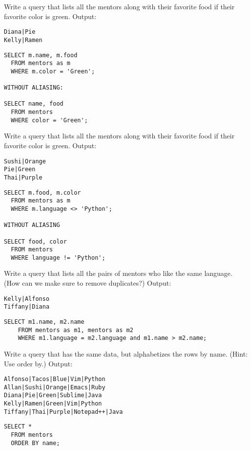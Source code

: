 \documentclass{exam}
\begin{document}
\begin{questions}
\begin{blocksection}
\question Write a query that lists all the mentors along with their favorite food if their favorite color is green.\newline
Output: 
\begin{lstlisting}
Diana|Pie 
Kelly|Ramen
\end{lstlisting}
\begin{solution}[1in]
\begin{lstlisting}
SELECT m.name, m.food
  FROM mentors as m
  WHERE m.color = 'Green';
  
WITHOUT ALIASING: 

SELECT name, food
  FROM mentors
  WHERE color = 'Green';
\end{lstlisting}
\end{solution}

\question Write a query that lists all the mentors along with their favorite food if their favorite color is green.\newline
Output: 
\begin{lstlisting}
Sushi|Orange
Pie|Green
Thai|Purple
\end{lstlisting}
\begin{solution}[1in]
\begin{lstlisting}
SELECT m.food, m.color
  FROM mentors as m
  WHERE m.language <> 'Python';

WITHOUT ALIASING

SELECT food, color
  FROM mentors
  WHERE language != 'Python';
\end{lstlisting}
\end{solution}
\end{blocksection}

\begin{blocksection}
\question Write a query that lists all the pairs of mentors who like the same language. (How can we make sure to remove duplicates?) \newline
Output:
\begin{lstlisting}
Kelly|Alfonso
Tiffany|Diana
\end{lstlisting}
\begin{solution}[2in]
\begin{lstlisting}
SELECT m1.name, m2.name 
    FROM mentors as m1, mentors as m2 
    WHERE m1.language = m2.language and m1.name > m2.name;
\end{lstlisting}
\end{solution}

\question Write a query that has the same data, but alphabetizes the rows by name. (Hint: Use order by.) \newline
Output:
\begin{lstlisting}
Alfonso|Tacos|Blue|Vim|Python
Allan|Sushi|Orange|Emacs|Ruby
Diana|Pie|Green|Sublime|Java
Kelly|Ramen|Green|Vim|Python
Tiffany|Thai|Purple|Notepad++|Java
\end{lstlisting}
\begin{solution}[1in]
\begin{lstlisting}
SELECT * 
  FROM mentors
  ORDER BY name;
\end{lstlisting}
\end{solution}
\end{blocksection}



\end{questions}
\end{document}
